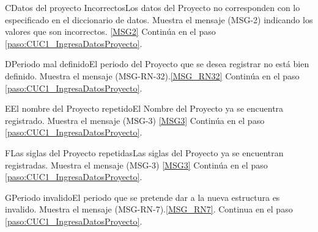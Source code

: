 	\begin{UCtrayectoriaA}{C}{Datos del proyecto Incorrectos}{Los datos del Proyecto no corresponden con lo especificado en el diccionario de datos.}
			\UCpaso Muestra el mensaje (MSG-2) indicando los valores que son incorrectos. \ref{MSG2}
			\UCpaso Continúa en el paso \ref{paso:CUC1_IngresaDatosProyecto}.
	\end{UCtrayectoriaA}

	\begin{UCtrayectoriaA}{D}{Periodo mal definido}{El periodo del Proyecto que se desea registrar no está bien definido.}
			\UCpaso Muestra el mensaje (MSG-RN-32).\ref{MSG_RN32}
			\UCpaso Continúa en el paso \ref{paso:CUC1_IngresaDatosProyecto}.
	\end{UCtrayectoriaA}


	\begin{UCtrayectoriaA}{E}{El nombre del Proyecto repetido}{El Nombre del Proyecto ya se encuentra registrado.}
			\UCpaso Muestra el mensaje (MSG-3) \ref{MSG3}
			\UCpaso Continúa en el paso \ref{paso:CUC1_IngresaDatosProyecto}.
	\end{UCtrayectoriaA}
	
	\begin{UCtrayectoriaA}{F}{Las siglas del Proyecto repetidas}{Las siglas del Proyecto ya se encuentran registradas.}
			\UCpaso Muestra el mensaje (MSG-3) \ref{MSG3}
			\UCpaso Continúa en el paso \ref{paso:CUC1_IngresaDatosProyecto}.
	\end{UCtrayectoriaA}

	\begin{UCtrayectoriaA}{G}{Periodo invalido}{El periodo que se pretende dar a la nueva estructura es invalido.}
		\UCpaso Muestra el mensaje (MSG-RN-7).\ref{MSG_RN7}.
		\UCpaso Continua en el paso \ref{paso:CUC1_IngresaDatosProyecto}.
	\end{UCtrayectoriaA}























